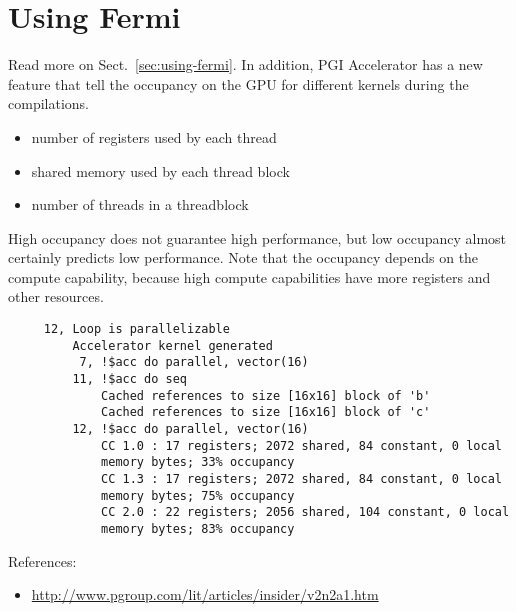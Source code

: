 \section{Using Fermi}
\label{sec:using-fermi-1}


Read more on Sect.~\ref{sec:using-fermi}. In addition, PGI
Accelerator has a new feature that tell the occupancy on the GPU for
different kernels during the compilations. 
\begin{itemize}
\item number of registers used by each thread
\item shared memory used by each thread block
\item number of threads in a threadblock
\end{itemize}
High occupancy does not guarantee high performance, but low occupancy
almost certainly predicts low performance. Note that the occupancy
depends on the compute capability, because high compute capabilities
have more registers and other resources.
\begin{verbatim}
     12, Loop is parallelizable
         Accelerator kernel generated
          7, !$acc do parallel, vector(16)
         11, !$acc do seq
             Cached references to size [16x16] block of 'b'
             Cached references to size [16x16] block of 'c'
         12, !$acc do parallel, vector(16)
             CC 1.0 : 17 registers; 2072 shared, 84 constant, 0 local
             memory bytes; 33% occupancy
             CC 1.3 : 17 registers; 2072 shared, 84 constant, 0 local
             memory bytes; 75% occupancy
             CC 2.0 : 22 registers; 2056 shared, 104 constant, 0 local
             memory bytes; 83% occupancy
\end{verbatim}

References:
\begin{itemize}
\item \url{http://www.pgroup.com/lit/articles/insider/v2n2a1.htm}
\end{itemize}


